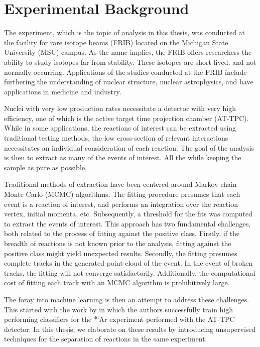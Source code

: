 \chapter{Experimental Background}\label{ch:experimental}

The experiment, which is the topic of analysis in this thesis, was conducted at the facility for rare isotope beams (FRIB) located on the Michigan State University (MSU) campus. As the name implies, the FRIB offers researchers the ability to study isotopes far from stability. These isotopes are short-lived, and not normally occurring. Applications of the studies conducted at the FRIB include furthering the understanding of nuclear structure, nuclear astrophysics, and have applications in medicine and industry. 

Nuclei with very low production rates necessitate a detector with very high efficiency, one of which is the active target time projection chamber (AT-TPC). While in some applications, the reactions of interest can be extracted using traditional testing methods, the low cross-section of relevant interactions necessitates an individual consideration of each reaction. The goal of the analysis is then to extract as many of the events of interest. All the while keeping the sample as pure as possible. 

Traditional methods of extraction have been centered around Markov chain Monte Carlo (MCMC) algorithms. The fitting procedure presumes that each event is a reaction of interest, and performs an integration over the reaction vertex, initial momenta, etc. Subsequently, a threshold for the fits was computed to extract the events of interest. This approach has two fundamental challenges, both related to the process of fitting against the positive class. Firstly, if the breadth of reactions is not known prior to the analysis, fitting against the positive class might yield unexpected results. Secondly, the fitting presumes complete tracks in the generated point-cloud of the event. In the event of broken tracks, the fitting will not converge satisfactorily. Additionally, the computational cost of fitting each track with an MCMC algorithm is prohibitively large. 

The foray into machine learning is then an attempt to address these challenges. This started with the work by \citet{Kuchera2019} in which the authors successfully train high performing classifiers for the ${}^{46}$Ar experiment performed with the AT-TPC detector. In this thesis, we elaborate on these results by introducing unsupervised techniques for the separation of reactions in the same experiment.